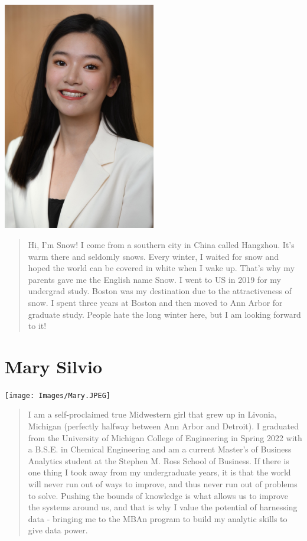 \documentclass[
]{book}
\begin{document}
\includegraphics[width=0.5\textwidth,height=\textheight]{Images/Snow.png}

\begin{quote}
Hi, I'm Snow! I come from a southern city in China called Hangzhou. It's warm there and seldomly snows. Every winter, I waited for snow and hoped the world can be covered in white when I wake up. That's why my parents gave me the English name Snow. I went to US in 2019 for my undergrad study. Boston was my destination due to the attractiveness of snow. I spent three years at Boston and then moved to Ann Arbor for graduate study. People hate the long winter here, but I am looking forward to it!
\end{quote}

\hypertarget{mary-silvio}{%
\section{Mary Silvio}\label{mary-silvio}}

\texttt{[image: Images/Mary.JPEG]}

\begin{quote}
I am a self-proclaimed true Midwestern girl that grew up in Livonia, Michigan (perfectly halfway between Ann Arbor and Detroit). I graduated from the University of Michigan College of Engineering in Spring 2022 with a B.S.E. in Chemical Engineering and am a current Master's of Business Analytics student at the Stephen M. Ross School of Business. If there is one thing I took away from my undergraduate years, it is that the world will never run out of ways to improve, and thus never run out of problems to solve. Pushing the bounds of knowledge is what allows us to improve the systems around us, and that is why I value the potential of harnessing data - bringing me to the MBAn program to build my analytic skills to give data power.
\end{quote}
\end{document}
